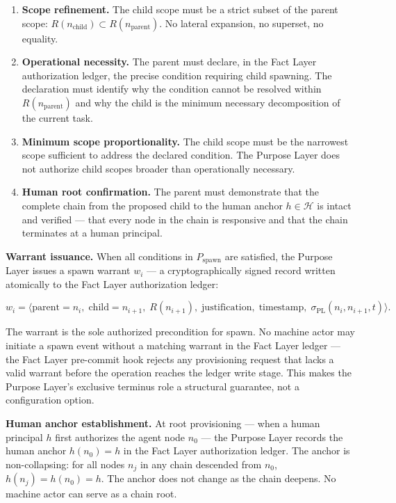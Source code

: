 \begin{enumerate}
    \item[(S1)] \textbf{Scope refinement.} The child scope must be a strict subset of the parent scope: $R(n_{\text{child}}) \subset R(n_{\text{parent}})$. No lateral expansion, no superset, no equality.

    \item[(S2)] \textbf{Operational necessity.} The parent must declare, in the Fact Layer authorization ledger, the precise condition requiring child spawning. The declaration must identify why the condition cannot be resolved within $R(n_{\text{parent}})$ and why the child is the minimum necessary decomposition of the current task.

    \item[(S3)] \textbf{Minimum scope proportionality.} The child scope must be the narrowest scope sufficient to address the declared condition. The Purpose Layer does not authorize child scopes broader than operationally necessary.

    \item[(S4)] \textbf{Human root confirmation.} The parent must demonstrate that the complete chain from the proposed child to the human anchor $h \in \mathcal{H}$ is intact and verified — that every node in the chain is responsive and that the chain terminates at a human principal.
\end{enumerate}

\medskip
\noindent\textbf{Warrant issuance.} When all conditions in $P_{\text{spawn}}$ are satisfied, the Purpose Layer issues a spawn warrant $w_i$ — a cryptographically signed record written atomically to the Fact Layer authorization ledger:

\begin{equation}
w_i = \bigl\langle
\text{parent}=n_i,\;
\text{child}=n_{i+1},\;
R(n_{i+1}),\;
\text{justification},\;
\text{timestamp},\;
\sigma_{\text{PL}}(n_i, n_{i+1}, t)
\bigr\rangle .
\label{eq:spawn-warrant}
\end{equation}

The warrant is the sole authorized precondition for spawn. No machine actor may initiate a spawn event without a matching warrant in the Fact Layer ledger — the Fact Layer pre-commit hook rejects any provisioning request that lacks a valid warrant before the operation reaches the ledger write stage. This makes the Purpose Layer's exclusive terminus role a structural guarantee, not a configuration option.

\medskip
\noindent\textbf{Human anchor establishment.} At root provisioning — when a human principal $h$ first authorizes the agent node $n_0$ — the Purpose Layer records the human anchor $h(n_0) = h$ in the Fact Layer authorization ledger. The anchor is non-collapsing: for all nodes $n_j$ in any chain descended from $n_0$, $h(n_j) = h(n_0) = h$. The anchor does not change as the chain deepens. No machine actor can serve as a chain root.

